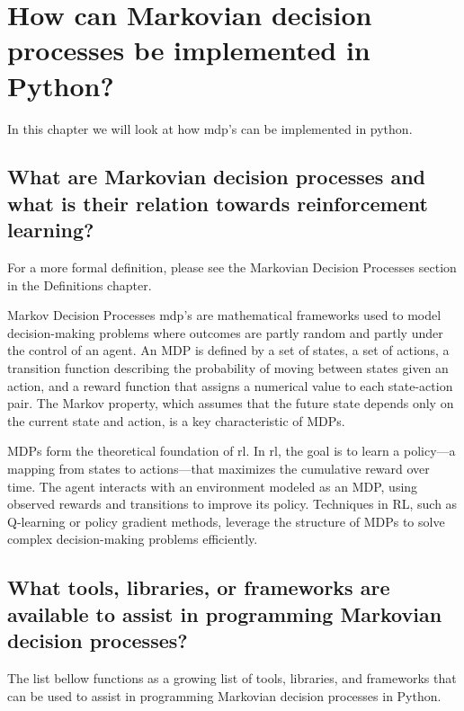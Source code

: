 \section{How can Markovian decision processes be implemented in Python?}

In this chapter we will look at how \gls{mdp}'s can be implemented in python.

\subsection{What are Markovian decision processes and what is their relation towards reinforcement learning?}

For a more formal definition, please see the Markovian Decision Processes section in the Definitions chapter.

Markov Decision Processes \gls{mdp}'s are mathematical frameworks used to model decision-making problems where outcomes are partly random and partly under the control of an agent. An MDP is defined by a set of states, a set of actions, a transition function describing the probability of moving between states given an action, and a reward function that assigns a numerical value to each state-action pair. The Markov property, which assumes that the future state depends only on the current state and action, is a key characteristic of MDPs.

MDPs form the theoretical foundation of \gls{rl}. In \gls{rl}, the goal is to learn a policy—a mapping from states to actions—that maximizes the cumulative reward over time. The agent interacts with an environment modeled as an MDP, using observed rewards and transitions to improve its policy. Techniques in RL, such as Q-learning or policy gradient methods, leverage the structure of MDPs to solve complex decision-making problems efficiently.

\subsection{What tools, libraries, or frameworks are available to assist in programming Markovian decision processes?}

The list bellow functions as a growing list of tools, libraries, and frameworks that can be used to assist in programming Markovian decision processes in Python.

